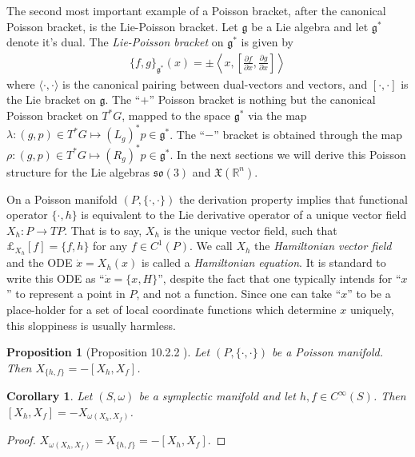 \documentclass[12pt]{amsart}
\newcommand{\pder}[2]{\ensuremath{\frac{\partial #1}{\partial #2}}}
\newcommand{\so}{\ensuremath{\mathfrak{so}}}
\newtheorem{prop}[thm]{Proposition}
\newtheorem{cor}[thm]{Corollary}
\begin{document}
The second most important example of a Poisson bracket,
after the canonical Poisson bracket,
is the Lie-Poisson bracket.  Let $\mathfrak{g}$ be a Lie algebra
and let $\mathfrak{g}^*$ denote it's dual.
The \emph{Lie-Poisson bracket} on $\mathfrak{g}^*$ is given 
by
\begin{align}
  \{ f , g \}_{\mathfrak{g}^*}( x ) = \pm
  \left \langle x , \left[ \pder{f}{x} , \pder{g}{x} \right] \right \rangle
  \label{eq:Lie-Poisson}
\end{align}
where $\langle \cdot , \cdot \rangle$ is the canonical pairing between
dual-vectors and vectors, and $[ \cdot , \cdot ]$ is the Lie bracket
on $\mathfrak{g}$.
The ``$+$'' Poisson bracket is nothing but the canonical Poisson bracket on $T^*G$,
mapped to the space $\mathfrak{g}^*$ via the map $\lambda: (g,p) \in T^*G \mapsto (L_g)^*p \in \mathfrak{g}^*$.
The ``$-$'' bracket is obtained through the map
$\rho:(g,p) \in T^*G \mapsto (R_g)^*p \in \mathfrak{g}^*$.
In the next sections we will derive this Poisson structure for the 
Lie algebras $\so(3)$ and $\mathfrak{X}(\mathbb{R}^n)$.


On a Poisson manifold $(P,\{ \cdot , \cdot \})$
the derivation property implies that functional operator
$\{ \cdot , h \}$ is equivalent
to the Lie derivative operator of a unique vector field $X_h:P \to TP$.
That is to say, $X_h$ is the unique vector field, such that $\pounds_{X_h}[f] = \{ f , h \}$ for any $f \in C^1(P)$.
We call $X_h$ the \emph{Hamiltonian vector field} and the ODE $\dot{x} = X_h(x)$ is called a \emph{Hamiltonian equation}.
It is standard to write this ODE as ``$\dot{x} = \{ x , H\}$'',
despite the fact that one typically intends for ``$x$'' to represent
a point in $P$, and not a function.
Since one can take ``$x$'' to be a place-holder for a set of
local coordinate functions which determine $x$ uniquely, this
sloppiness is usually harmless.

\begin{prop}[Proposition 10.2.2 \cite{MandS}] \label{prop:Lie_hom}
  Let $(P,\{ \cdot , \cdot \})$ be a Poisson manifold.
  Then $X_{ \{ h ,f \} } = - [X_h , X_f ]$.
\end{prop}

\begin{cor} \label{cor:Lie_hom}
  Let $(S,\omega)$ be a symplectic manifold
  and let $h,f \in C^{\infty}(S)$.
  Then $[X_h , X_f] = -X_{\omega(X_h,X_f) }$.
\end{cor}
\begin{proof}
  $X_{\omega(X_h,X_f)} = X_{ \{h,f\} } = -[X_h , X_f]$.
\end{proof}
\end{document}
